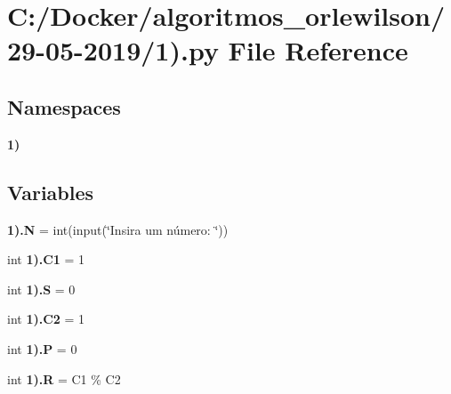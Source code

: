 \section{C\+:/\+Docker/algoritmos\+\_\+orlewilson/29-\/05-\/2019/1).py File Reference}
\label{1_08_8py}
\subsection*{Namespaces}
\begin{DoxyCompactItemize}
\item 
 \textbf{ 1)}
\end{DoxyCompactItemize}
\subsection*{Variables}
\begin{DoxyCompactItemize}
\item 
\textbf{ 1).\+N} = int(input(\char`\"{}Insira um número\+: \char`\"{}))
\item 
int \textbf{ 1).\+C1} = 1
\item 
int \textbf{ 1).\+S} = 0
\item 
int \textbf{ 1).\+C2} = 1
\item 
int \textbf{ 1).\+P} = 0
\item 
int \textbf{ 1).\+R} = C1 \% C2
\end{DoxyCompactItemize}
